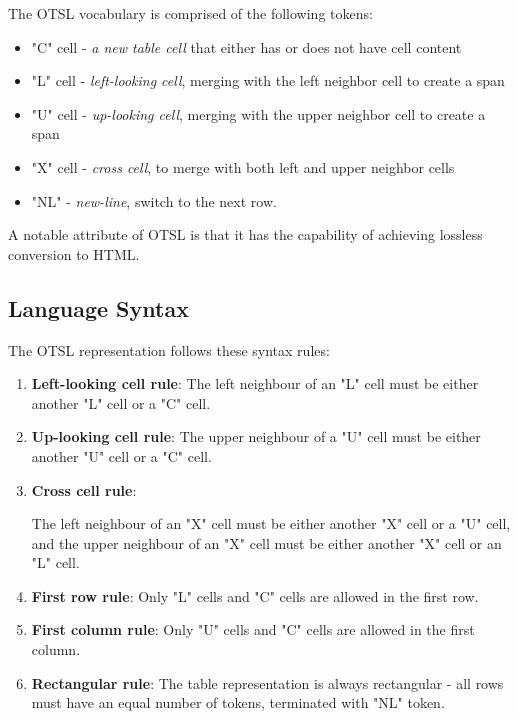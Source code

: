 \documentclass[runningheads]{llncs}
\begin{document}
The OTSL vocabulary is comprised of the following tokens:
\begin{itemize}
\item "C" cell - \textit{a new table cell} that either has or does not have cell content
\item "L" cell - \textit{left-looking cell}, merging with the left neighbor cell to create a span
\item "U" cell - \textit{up-looking cell}, merging with the upper neighbor cell to create a span
\item "X" cell - \textit{cross cell}, to merge with both left and upper neighbor cells
\item "NL" - \textit{new-line}, switch to the next row.
\end{itemize}

A notable attribute of OTSL is that it has the capability of achieving lossless conversion to HTML.

\subsection{Language Syntax}

The OTSL representation follows these syntax rules:

\begin{enumerate}
\item \textbf{Left-looking cell rule}: 
The left neighbour of an "L" cell must be either another "L" cell or a "C" cell.
\item \textbf{Up-looking cell rule}:
The upper neighbour of a "U" cell must be either another "U" cell or a "C" cell.
\item \textbf{Cross cell rule}:

The left neighbour of an "X" cell must be either another "X" cell or a "U" cell, and the upper neighbour of an "X" cell must be either another "X" cell or an "L" cell.
\item \textbf{First row rule}:
Only "L" cells and "C" cells are allowed in the first row.
\item \textbf{First column rule}:
Only "U" cells and "C" cells are allowed in the first column.
\item \textbf{Rectangular rule}:
The table representation is always rectangular - all rows must have an equal number of tokens, terminated with "NL" token.
\end{enumerate}
\end{document}
